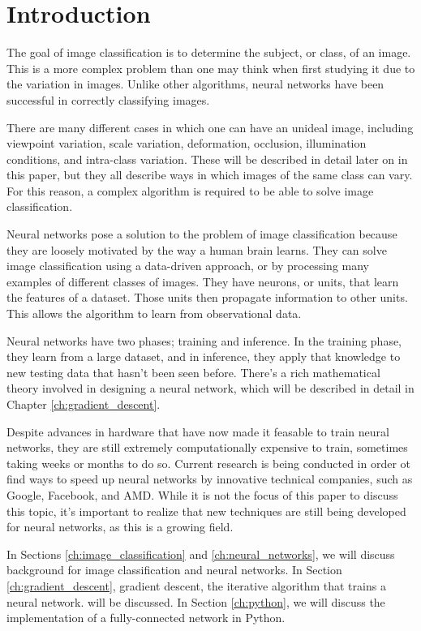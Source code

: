 \newpage
\section{Introduction}

The goal of image classification is to determine the subject, or class, of an
image. This is a more complex problem than one may think when first studying it
due to the variation in images. Unlike other algorithms, neural networks have
been successful in correctly classifying images.

There are many different cases in which one can have an unideal image,
including viewpoint variation, scale variation, deformation, occlusion,
illumination conditions, and intra-class variation. These will be described in
detail later on in this paper, but they all describe ways in which images of
the same class can vary. For this reason, a complex algorithm is required to be
able to solve image classification.

Neural networks pose a solution to the problem of image classification because
they are loosely motivated by the way a human brain learns. They can solve
image classification using a data-driven approach, or by processing many
examples of different classes of images. They have neurons, or units, that
learn the features of a dataset. Those units then propagate information to
other units. This allows the algorithm to learn from observational data.

Neural networks have two phases; training and inference. In the training phase,
they learn from a large dataset, and in inference, they apply that knowledge to
new testing data that hasn't been seen before. There's a rich mathematical
theory involved in designing a neural network, which will be described in
detail in Chapter \ref{ch:gradient_descent}.

Despite advances in hardware that have now made it feasable to train neural
networks, they are still extremely computationally expensive to train,
sometimes taking weeks or months to do so. Current research is being conducted
in order ot find ways to speed up neural networks by innovative technical
companies, such as Google, Facebook, and AMD. While it is not the focus of this
paper to discuss this topic, it's important to realize that new techniques are
still being developed for neural networks, as this is a growing field.

In Sections \ref{ch:image_classification} and \ref{ch:neural_networks}, we will
discuss background for image classification and neural networks. In Section
\ref{ch:gradient_descent}, gradient descent, the iterative algorithm that
trains a neural network. will be discussed. In Section \ref{ch:python}, we will
discuss the implementation of a fully-connected network in Python.
